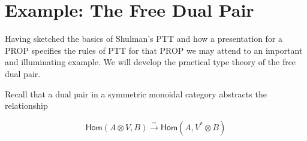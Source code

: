 \documentclass[pra,floatfix,
amsmath,superscriptaddress, 12pt]{article}
\theoremstyle{definition}
\newcommand{\liso}{\overset{\sim}{\longrightarrow}}
\newcommand{\coev}{\mathsf{coev}}
\begin{document}

\section{Example: The Free Dual Pair}\label{ex:TheFreeDualPair}


Having sketched the basics of Shulman's \textsf{PTT} and how a presentation for a \textsf{PROP} specifies the rules of \textsf{PTT} for that \textsf{PROP} we may attend to an important and illuminating example. We will develop the practical type theory of the free dual pair.

Recall that a dual pair in a symmetric monoidal category abstracts the relationship

\[
     \mathsf{Hom}\left(A\otimes V,B\right)\liso\mathsf{Hom}\left(A,V^{*}\otimes B\right)
\]
\end{document}
